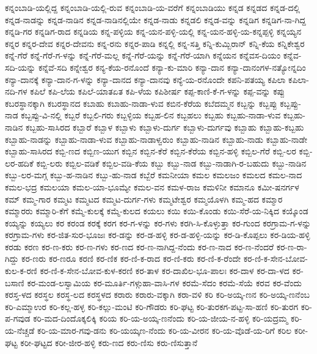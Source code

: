 ಕನ್ನಂಬಾಡಿ-ಯಲ್ಲಿದ್ದ
ಕನ್ನಂಬಾಡಿ-ಯಲ್ಲಿ-ರುವ
ಕನ್ನಂಬಾಡಿ-ಯ-ವರೆಗೆ
ಕನ್ನಂಬಾಡಿಯು
ಕನ್ನಡ
ಕನ್ನಡದ
ಕನ್ನಡ-ದಲ್ಲಿ
ಕನ್ನಡ-ನಾಡನ್ನು
ಕನ್ನಡ-ನಾಡಿನ
ಕನ್ನಡ-ನಾಡಿನಲ್ಲಿಯೇ
ಕನ್ನಡ-ನಾಡು
ಕನ್ನಡಲಿ
ಕನ್ನಡ-ವನ್ನು
ಕನ್ನಡಿಗ
ಕನ್ನಡಿಗ-ನಾ-ಗಿದ್ದ
ಕನ್ನಡಿ-ಗರ
ಕನ್ನಡಿಗ-ರಾದ
ಕನ್ನಡಿಯ
ಕನ್ನ-ಪಳ್ಳಿಯ
ಕನ್ನ-ಯನ-ಪಳ್ಳಿ-ಯಲ್ಲಿ
ಕನ್ನ-ಯನ-ಹಳ್ಳಿ-ಯ-ಕನ್ನಪ್ಪಳ್ಳಿ
ಕನ್ನಯ್ಯನ
ಕನ್ನರ
ಕನ್ನರ-ದೇವ
ಕನ್ನರ-ದೇವನು
ಕನ್ನ-ರನು
ಕನ್ನರ-ಪಾಡಿ
ಕನ್ನಲ್ಲಿ
ಕನ್ನ-ಸತ್ತಿ
ಕನ್ನಿ-ಕುಮ್ಬಿರಾನ್
ಕನ್ನಿ-ಕೆಯ
ಕನ್ನಿಕೇಶ್ವರ
ಕನ್ನೆ-ಗೆರೆ
ಕನ್ನೆ-ಗೆರೆ-ಗ-ಳನ್ನು
ಕನ್ನೆ-ಗೆರೆ-ಮಲ್ಲ
ಕನ್ನೆ-ಗೆರೆ-ಯನ್ನು
ಕನ್ನೆ-ಗೆರೆ-ಯಾಗಿ
ಕನ್ನೆಯನ
ಕನ್ನೆವಸ-ದಿಯಂ
ಕನ್ನೆವ-ಸದಿ-ಯನ್ನು
ಕನ್ನೆವೆ-ಸದಿ
ಕನ್ನೇಶ್ವರ
ಕನ್ಯ-ಕೆಯ-ರನೊಂದೆ
ಕನ್ಯಾ-ಕು-ಮಾರಿ
ಕನ್ಯಾ-ದಾನ
ಕನ್ಯಾ-ದಾನಂಗಳ-ನತ್ಯೋನ್ನದಿಂ
ಕನ್ಯಾ-ದಾನಕ್ಕೆ
ಕನ್ಯಾ-ದಾನ-ಗ-ಳನ್ನು
ಕನ್ಯಾ-ದಾನದ
ಕನ್ಯಾ-ದಾನವು
ಕನ್ಯೆ-ಯ-ರನೊಂದೇ
ಕಪನಿ-ಪತಯ್ಯ
ಕಪಿಲಾ
ಕಪಿಲಾ-ನದಿ-ಗಳ
ಕಪಿಲೆ
ಕಪಿ-ಲೆಯ
ಕಪಿಲೆ-ಯಾತಏತ
ಕಪಿ-ಳೆಯ
ಕಪಿಶೀರ್ಷ
ಕಪ್ಪ-ಕಾಣಿ-ಕೆ-ಗ-ಳನ್ನು
ಕಪ್ಪ-ವನ್ನು
ಕಪ್ಪು
ಕಬರಸ್ಥಾನಕ್ಕಾಗಿ
ಕಬರಸ್ಥಾನದ
ಕಬಾಹು
ಕಬಾಹು-ನಾಡಾ-ಳುವ
ಕಬಿನ-ಕೆರೆಯ
ಕಬೆದಮ್ಮನ
ಕಬ್ಬನ್ನು
ಕಬ್ಬಪ್ಪು
ಕಬ್ಬಪ್ಪು-ನಾಡ
ಕಬ್ಬಪ್ಪು-ವಿ-ನಲ್ಲಿ
ಕಬ್ಬರೆ
ಕಬ್ಬಲಿ-ಗರು
ಕಬ್ಬಳ್ಳಿಯ
ಕಬ್ಬಹ-ಲಿನ
ಕಬ್ಬಹಲು
ಕಬ್ಬಹು
ಕಬ್ಬಹು-ನಾಡಾ-ಳುವ
ಕಬ್ಬಹು-ನಾಡಿನ
ಕಬ್ಬಹು-ಸಾಸಿರದ
ಕಬ್ಬಾರೆ
ಕಬ್ಬಾಳ
ಕಬ್ಬಾಳು
ಕಬ್ಬಾಳು-ದುರ್ಗ
ಕಬ್ಬಾಳು-ದುರ್ಗವು
ಕಬ್ಬಾಹು
ಕಬ್ಬಾಹು-ಕಬ್ಬಹು
ಕಬ್ಬಾಹು-ನಾಡನ್ನು
ಕಬ್ಬಾಹು-ನಾಡಾ-ಳುವ
ಕಬ್ಬಾಹು-ನಾಡಾಳ್ವರುಂ
ಕಬ್ಬಾಹು-ನಾಡಿನ
ಕಬ್ಬಾಹು-ನಾಡು
ಕಬ್ಬಾಹು-ನಾಡೇ
ಕಬ್ಬಾಹು-ಸಾಸಿರದ
ಕಬ್ಬಿ-ಣದ
ಕಬ್ಬಿಣ-ಯುಗ
ಕಬ್ಬಿನ
ಕಬ್ಬಿನ-ಕೆರೆ
ಕಬ್ಬಿನ-ಕೆರೆಯ
ಕಬ್ಬಿನ-ಹಳ್ಳಿ
ಕಬ್ಬಿಲ-ಗೆರೆ
ಕಬ್ಬಿ-ಲರ
ಕಬ್ಬಿ-ಲರ-ಹದಿಕೆ
ಕಬ್ಬಿ-ಲರು
ಕಬ್ಬಿಲ-ವಡಿಕೆ
ಕಬ್ಬಿಲ-ವಡಿ-ಕೆಯ
ಕಬ್ಬು
ಕಬ್ಬು-ನಾಡ
ಕಬ್ಬು-ನಾಡಾಗಿ-ರ-ಬಹುದು
ಕಬ್ಬು-ನಾಡಿನ
ಕಬ್ಬು-ಲರ-ಮಗ್ಗ
ಕಬ್ಬು-ಹ-ನಾಡಿನ
ಕಬ್ಬು-ಹು-ನಾಡ
ಕಬ್ಬೆರೆ
ಕಮನೀಯಾ
ಕಮಲ
ಕಮಲಜಂ
ಕಮಲದ
ಕಮಲ-ನಾದ
ಕಮಲ-ಭದ್ರ
ಕಮಲಯಾ
ಕಮಲ-ಯಾ-ಭೂಮ್ಯೇ
ಕಮಲ-ವನ
ಕಮಳ-ರಾಜ
ಕಮಳಿನೀ
ಕಮಾನೂ
ಕಮೀ-ಷನರ್ಗಳ
ಕಮ್
ಕಮ್ಮ-ಗಾರ
ಕಮ್ಮಟ
ಕಮ್ಮಟದ
ಕಮ್ಮಟ-ದುರ್ಗ-ಗಳು
ಕಮ್ಮಟೇಶ್ವರ
ಕಮ್ಮಯೊಳಗಿ
ಕಮ್ಮ-ಹದ
ಕಮ್ಮಾರ
ಕಮ್ಮಾರರು
ಕಮ್ಮಾರಿ-ಕೆಗೆ
ಕಮ್ಮೆ-ಕುಲಕ್ಕೆ
ಕಮ್ಮೆ-ಕುಲದ
ಕಯಲು
ಕಯಿ
ಕಯಿ-ಕೊಂಡು
ಕಯಿ-ಸೆರೆ-ಯ-ನಿಕ್ಕಿದ
ಕಯ್ಕೊಂಡ
ಕಯ್ಯನ್ನು
ಕಯ್ಯಲು
ಕರ
ಕರಂಡ
ಕರಕ್ಕೆ
ಕರಗ
ಕರ-ಗ-ಳನ್ನು
ಕರ-ಗಳು
ಕರಗಿ-ಸಿ-ಕೊಳ್ಳುತ್ತಾ
ಕರ-ಗುಂದ
ಕರಗ್ರಾಮ-ಗ-ಳನ್ನು
ಕರಗ್ರಾಮ-ಗಳು
ಕರ-ಜಿತ-ಸುರ-ಭೂಜಃ
ಕರ-ಡನ್ನು
ಕರ-ಡ-ಹಳ್ಳಿ
ಕರ-ಡ-ಹಳ್ಳಿ-ಯನ್ನು
ಕರ-ಡಿ-ಕೊಪ್ಪಲು
ಕರ-ಡಿಯ-ಹಳ್ಳಿ
ಕರಡು
ಕರಣ
ಕರ-ಣ-ಕರು
ಕರ-ಣ-ಗಳು
ಕರ-ಣದ
ಕರ-ಣ-ನಾಗಿದ್ದ-ನೆಂದು
ಕರ-ಣ-ನಾದ
ಕರ-ಣ-ನೆಂದರೆ
ಕರ-ಣ-ರಾ-ಗಿದ್ದು
ಕರ-ಣರು
ಕರ-ಣರೂ
ಕರಣಿ
ಕರ-ಣಿಕ
ಕರ-ಣಿ-ಕ-ರಾದ
ಕರ-ಣಿ-ಕರು
ಕರ-ಣಿ-ಕ-ರೆಂದೇ
ಕರ-ಣಿ-ಕ-ಸೇನ-ಬೋವ-ಕುಲ-ಕ-ರಣಿ
ಕರ-ಣಿ-ಕ-ಸೇನ-ಬೋವ-ಕುಳ-ಕರಣಿ
ಕರ-ತಾಳ
ಕರ-ದಾಖಿಲ-ಭೂ-ಪಾಲಃ
ಕರ-ದಾಳ
ಕರ-ದಾ-ಳದ
ಕರ-ಬಸಾಣಿ
ಕರ-ಮಂಡ-ಲಸ್ವಾಮಿಯ
ಕರ-ಮೂರ್ತಿ-ಗಳ್ಗುಹಾ-ವಾಸಿ-ಗಳ
ಕರಮೆ-ಸೆದಂ
ಕರಮೆ-ಸೆಯೆ
ಕರವ
ಕರ-ವೆಂದು
ಕರಸ್ತ-ಳದ
ಕರಸ್ಥಲ
ಕರಸ್ಥ-ಲದ
ಕರಸ್ಥಳದ
ಕರಾರು
ಕರಾರು-ವಕ್ಕಾಗಿ
ಕರಾ-ವಳಿ
ಕರಿ
ಕರಿ-ಅಯ್ಕ-ಣನ
ಕರಿ-ಅಯ್ಕ-ಣನೆಂಬ
ಕರಿ-ಎಮ್ಮಾಉರ
ಕರಿ-ಕಲ್ಲ-ಹಳ್ಳ
ಕರಿ-ಕಲ್ಲು-ಮಂಟಿ
ಕರಿ-ಗೌಡರು
ಕರಿ-ಘಟ್ಟ
ಕರಿ-ತುರಕಗ-ಪಟ್ಟ-ಸಾ-ಹಣಿ
ಕರಿ-ತುರಗ
ಕರಿ-ಪ-ಗವುಡ
ಕರಿ-ಮದ-ದಿಂದೊಕ್ಕಲಿಕ್ಕಿ
ಕರಿಯ
ಕರಿ-ಯ-ಅಯ್ಕ-ಣನೆಂದು
ಕರಿ-ಯ-ಜೀಯ-ನ-ಹಳ್ಳಿ
ಕರಿ-ಯದ್ರಮ್ಮ
ಕರಿ-ಯ-ನೆಚ್ಚಡೆ
ಕರಿ-ಯ-ಮಾರ-ಗವು-ಡನು
ಕರಿ-ಯಯ್ಕಣ-ನೆಂದು
ಕರಿ-ಯ-ವೀರನ
ಕರಿ-ಯ-ವೊಡೆ-ಯ-ರಿಗೆ
ಕರಿಲ
ಕರೀ-ಘಟ್ಟ
ಕರೀ-ಘಟ್ಟದ
ಕರೀ-ಜೀರ-ಹಳ್ಳಿ
ಕರು-ಣದ
ಕರು-ಣಿಸು
ಕರು-ಣಿಸುತ್ತಾನೆ
